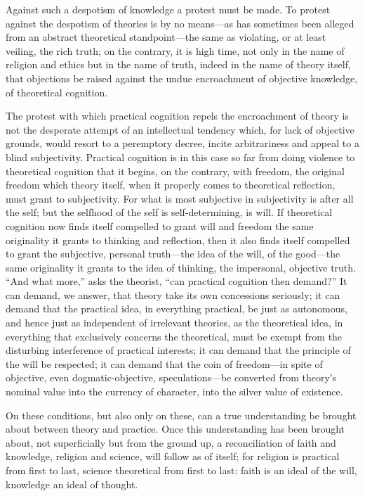 \documentclass[12pt,a4paper]{article}
\newcommand{\opage}[1]{\marginnote{\footnotesize\textit{[#1]}}}
\begin{document}
Against such a despotism of knowledge a protest must be made. To
protest against the despotism of theories is by no means---as has
sometimes been alleged from an abstract theoretical standpoint---the
same as violating, or at least veiling, the rich truth; on the
contrary, it is high time, not only in the name of religion and
ethics but in the name of truth, indeed in the name of theory itself,
that objections be raised against the undue encroachment of objective
knowledge, of theoretical cognition.

The protest with which practical cognition repels the encroachment of
theory is not the desperate attempt of an intellectual tendency which,
for lack of objective grounds, would resort to a peremptory decree,
incite arbitrariness and appeal to a blind subjectivity. Practical
cognition is in this case so far from doing violence to theoretical
cognition that it begins, on the contrary, with freedom, the original
freedom which theory itself, when it properly comes to theoretical
reflection, must grant to subjectivity. For what is most subjective in
subjectivity is after all the self; but the selfhood of the self is
self-determining, is will. If theoretical cognition now finds itself
compelled to grant will and freedom the same originality it grants to
thinking and reflection, then it also finds itself compelled to
\opage{72}grant the subjective, personal truth---the idea of the will,
of the good---the same originality it grants to the idea of thinking,
the impersonal, objective truth. ``And what more,'' asks the
theorist, ``can practical cognition then demand?'' It can demand, we
answer, that theory take its own concessions seriously; it can demand
that the practical idea, in everything practical, be just as
autonomous, and hence just as independent of irrelevant theories, as
the theoretical idea, in everything that exclusively concerns the
theoretical, must be exempt from the disturbing interference of
practical interests; it can demand that the principle of the will be
respected; it can demand that the coin of freedom---in spite of
objective, even dogmatic-objective, speculations---be converted from
theory's nominal value into the currency of character, into the
silver value of existence.

On these conditions, but also only on these, can a true understanding
be brought about between theory and practice. Once this understanding
has been brought about, not superficially but from the ground up, a
reconciliation of faith and knowledge, religion and science, will
follow as of itself; for religion is practical from first to last,
science theoretical from first to last: faith is an ideal of the will,
knowledge an ideal of thought.
\end{document}
